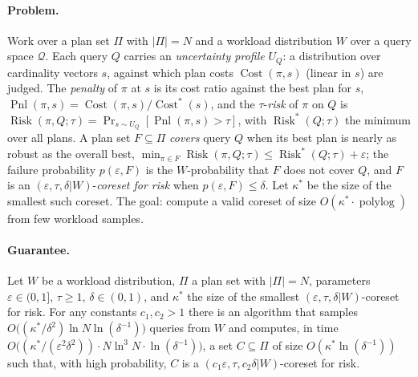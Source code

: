 \paragraph{Problem.}
Work over a plan set $\Pi$ with $|\Pi| = N$ and a workload distribution $W$ over a
query space $\mathcal{Q}$. Each query $Q$ carries an \emph{uncertainty profile}
$U_Q$: a distribution over cardinality vectors $s$, against which plan costs
$\operatorname{Cost}(\pi,s)$ (linear in $s$) are judged. The \emph{penalty} of $\pi$
at $s$ is its cost ratio against the best plan for $s$,
$\operatorname{Pnl}(\pi,s) = \operatorname{Cost}(\pi,s)/\operatorname{Cost}^{*}(s)$,
and the $\tau$-\emph{risk} of $\pi$ on $Q$ is
$\operatorname{Risk}(\pi,Q;\tau) = \Pr_{s\sim U_Q}[\operatorname{Pnl}(\pi,s)>\tau]$,
with $\operatorname{Risk}^{*}(Q;\tau)$ the minimum over all plans. A plan set
$F\subseteq\Pi$ \emph{covers} query $Q$ when its best plan is nearly as robust as the
overall best, $\min_{\pi\in F}\operatorname{Risk}(\pi,Q;\tau) \le
\operatorname{Risk}^{*}(Q;\tau)+\varepsilon$; the failure probability $p(\varepsilon,F)$
is the $W$-probability that $F$ does not cover $Q$, and $F$ is an
$(\varepsilon,\tau,\delta|W)$-\emph{coreset for risk} when $p(\varepsilon,F)\le\delta$.
Let $\kappa^{*}$ be the size of the smallest such coreset. The goal: compute a valid
coreset of size $O(\kappa^{*}\cdot\operatorname{polylog})$ from few workload samples.

\paragraph{Guarantee.}

\begin{theorem}\label{thm:exc-053-main}
Let $W$ be a workload distribution, $\Pi$ a plan set with $|\Pi|=N$, parameters
$\varepsilon\in(0,1]$, $\tau\ge 1$, $\delta\in(0,1)$, and $\kappa^{*}$ the size of the
smallest $(\varepsilon,\tau,\delta|W)$-coreset for risk. For any constants
$c_1,c_2>1$ there is an algorithm that samples
$O\bigl((\kappa^{*}/\delta^{2})\ln N\ln(\delta^{-1})\bigr)$ queries from $W$ and
computes, in time
$O\bigl((\kappa^{*}/(\varepsilon^{2}\delta^{2}))\cdot N\ln^{3}N\cdot
\ln(\delta^{-1})\bigr)$, a set $C\subseteq\Pi$ of size $O(\kappa^{*}\ln(\delta^{-1}))$
such that, with high probability, $C$ is a $(c_1\varepsilon,\tau,c_2\delta|W)$-coreset
for risk. \eop
\end{theorem}



